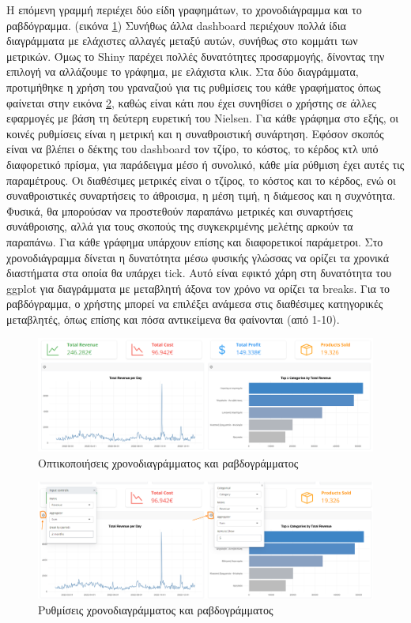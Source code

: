 \documentclass{article}
\begin{document}
Η επόμενη γραμμή περιέχει δύο είδη γραφημάτων, το χρονοδιάγραμμα και το ραβδόγραμμα. (εικόνα \ref{fig:9}) Συνήθως άλλα dashboard περιέχουν πολλά ίδια διαγράμματα με ελάχιστες αλλαγές μεταξύ αυτών, συνήθως στο κομμάτι των μετρικών. Όμως το Shiny παρέχει πολλές δυνατότητες προσαρμογής, δίνοντας την επιλογή να αλλάζουμε το γράφημα, με ελάχιστα κλικ. Στα δύο διαγράμματα, προτιμήθηκε η χρήση του γραναζιού για τις ρυθμίσεις του κάθε γραφήματος όπως φαίνεται στην εικόνα \ref{fig:10}, καθώς είναι κάτι που έχει συνηθίσει ο χρήστης σε άλλες εφαρμογές με βάση τη δεύτερη ευρετική του Nielsen. Για κάθε γράφημα στο εξής, οι κοινές ρυθμίσεις είναι η μετρική και η συναθροιστική συνάρτηση. Εφόσον σκοπός είναι να βλέπει ο δέκτης του dashboard τον τζίρο, το κόστος, το κέρδος κτλ υπό διαφορετικό πρίσμα, για παράδειγμα μέσο ή συνολικό, κάθε μία ρύθμιση έχει αυτές τις παραμέτρους. Οι διαθέσιμες μετρικές είναι ο τζίρος, το κόστος και το κέρδος, ενώ οι συναθροιστικές συναρτήσεις το άθροισμα, η μέση τιμή, η διάμεσος και η συχνότητα. Φυσικά, θα μπορούσαν να προστεθούν παραπάνω μετρικές και συναρτήσεις συνάθροισης, αλλά για τους σκοπούς της συγκεκριμένης μελέτης αρκούν τα παραπάνω. Για κάθε γράφημα υπάρχουν επίσης και διαφορετικοί παράμετροι. Στο χρονοδιάγραμμα δίνεται η δυνατότητα μέσω φυσικής γλώσσας να ορίζει τα χρονικά διαστήματα στα οποία θα υπάρχει tick. Αυτό είναι εφικτό χάρη στη δυνατότητα του ggplot για διαγράμματα με μεταβλητή άξονα τον χρόνο να ορίζει τα breaks. Για το ραβδόγραμμα, ο χρήστης μπορεί να επιλέξει ανάμεσα στις διαθέσιμες κατηγορικές μεταβλητές, όπως επίσης και πόσα αντικείμενα θα φαίνονται (από 1-10).

\begin{figure}[h]
    \centering
    \includegraphics[width=\textwidth]{pictures/9_timeline_bar_visuals.png}
    \caption{Οπτικοποιήσεις χρονοδιαγράμματος και ραβδογράμματος}
    \label{fig:9}
\end{figure}

\begin{figure}[h]
    \centering
    \includegraphics[width=\textwidth]{pictures/10_timeline_bar_visuals_open_filters.png}
    \caption{Ρυθμίσεις χρονοδιαγράμματος και ραβδογράμματος}
    \label{fig:10}
\end{figure}
\end{document}
